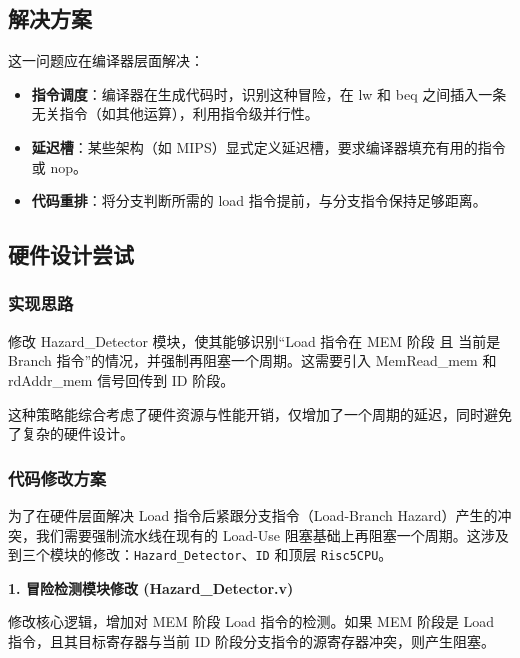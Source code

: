 \documentclass[12pt,a4paper]{article}
\begin{document}
\subsection{解决方案}

这一问题应在编译器层面解决：
    \begin{itemize}
        \item \textbf{指令调度}：编译器在生成代码时，识别这种冒险，在 lw 和 beq 之间插入一条无关指令（如其他运算），利用指令级并行性。
        \item \textbf{延迟槽}：某些架构（如 MIPS）显式定义延迟槽，要求编译器填充有用的指令或 nop。
        \item \textbf{代码重排}：将分支判断所需的 load 指令提前，与分支指令保持足够距离。
    \end{itemize}

\subsection{硬件设计尝试}
\subsubsection{实现思路}
修改 Hazard\_Detector 模块，使其能够识别“Load 指令在 MEM 阶段 且 当前是 Branch 指令”的情况，并强制再阻塞一个周期。这需要引入 MemRead\_mem 和 rdAddr\_mem 信号回传到 ID 阶段。

这种策略能综合考虑了硬件资源与性能开销，仅增加了一个周期的延迟，同时避免了复杂的硬件设计。
\subsubsection{代码修改方案}

为了在硬件层面解决 Load 指令后紧跟分支指令（Load-Branch Hazard）产生的冲突，我们需要强制流水线在现有的 Load-Use 阻塞基础上再阻塞一个周期。这涉及到三个模块的修改：\texttt{Hazard\_Detector}、\texttt{ID} 和顶层 \texttt{Risc5CPU}。

\textbf{1. 冒险检测模块修改 (Hazard\_Detector.v)}

修改核心逻辑，增加对 MEM 阶段 Load 指令的检测。如果 MEM 阶段是 Load 指令，且其目标寄存器与当前 ID 阶段分支指令的源寄存器冲突，则产生阻塞。
\end{document}
